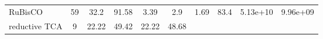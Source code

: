 \documentclass[]{article}
\begin{document}
\begin{longtable}[]{@{}lccccccccc@{}}
\begin{minipage}[t]{0.07\columnwidth}
RuBisCO\strut
\end{minipage} & \begin{minipage}[t]{0.06\columnwidth}\centering\strut
59\strut
\end{minipage} & \begin{minipage}[t]{0.08\columnwidth}\centering\strut
32.2\strut
\end{minipage} & \begin{minipage}[t]{0.08\columnwidth}\centering\strut
91.58\strut
\end{minipage} & \begin{minipage}[t]{0.08\columnwidth}\centering\strut
3.39\strut
\end{minipage} & \begin{minipage}[t]{0.08\columnwidth}\centering\strut
2.9\strut
\end{minipage} & \begin{minipage}[t]{0.08\columnwidth}\centering\strut
1.69\strut
\end{minipage} & \begin{minipage}[t]{0.08\columnwidth}\centering\strut
83.4\strut
\end{minipage} & \begin{minipage}[t]{0.08\columnwidth}\centering\strut
5.13e+10\strut
\end{minipage} & \begin{minipage}[t]{0.08\columnwidth}\centering\strut
9.96e+09\strut
\end{minipage}\tabularnewline
\begin{minipage}[t]{0.07\columnwidth}\raggedright\strut
reductive TCA\strut
\end{minipage} & \begin{minipage}[t]{0.06\columnwidth}\centering\strut
9\strut
\end{minipage} & \begin{minipage}[t]{0.08\columnwidth}\centering\strut
22.22\strut
\end{minipage} & \begin{minipage}[t]{0.08\columnwidth}\centering\strut
49.42\strut
\end{minipage} & \begin{minipage}[t]{0.08\columnwidth}\centering\strut
22.22\strut
\end{minipage} & \begin{minipage}[t]{0.08\columnwidth}\centering\strut
48.68\strut
\end{minipage} & \begin{minipage}[t]{0.08\columnwidth}\centering\strut

\end{minipage}
\end{longtable}
\end{document}
